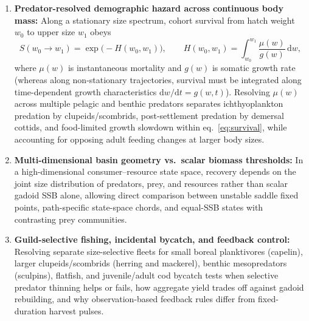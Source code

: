 \documentclass[11pt,letterpaper]{article}
\begin{document}
\begin{enumerate}
  \item \textbf{Predator-resolved demographic hazard across continuous body mass:} Along a stationary size spectrum, cohort survival from hatch weight $w_0$ to upper size $w_1$ obeys
  \begin{equation}
    S(w_0 \to w_1) = \exp\!\big(-H(w_0, w_1)\big), \qquad
    H(w_0, w_1) = \int_{w_0}^{w_1} \frac{\mu(w)}{g(w)}\,\mathrm{d}w,
    \label{eq:survival}
  \end{equation}
  where $\mu(w)$ is instantaneous mortality and $g(w)$ is somatic growth rate (whereas along non-stationary trajectories, survival must be integrated along time-dependent growth characteristics $\mathrm{d}w/\mathrm{d}t = g(w,t)$). Resolving $\mu(w)$ across multiple pelagic and benthic predators separates ichthyoplankton predation by clupeids/scombrids, post-settlement predation by demersal cottids, and food-limited growth slowdown within eq.~\eqref{eq:survival}, while accounting for opposing adult feeding changes at larger body sizes.
  \item \textbf{Multi-dimensional basin geometry vs.\ scalar biomass thresholds:} In a high-dimensional consumer--resource state space, recovery depends on the joint size distribution of predators, prey, and resources rather than scalar gadoid SSB alone, allowing direct comparison between unstable saddle fixed points, path-specific state-space chords, and equal-SSB states with contrasting prey communities.
  \item \textbf{Guild-selective fishing, incidental bycatch, and feedback control:} Resolving separate size-selective fleets for small boreal planktivores (capelin), larger clupeids/scombrids (herring and mackerel), benthic mesopredators (sculpins), flatfish, and juvenile/adult cod bycatch tests when selective predator thinning helps or fails, how aggregate yield trades off against gadoid rebuilding, and why observation-based feedback rules differ from fixed-duration harvest pulses.
\end{enumerate}
\end{document}
